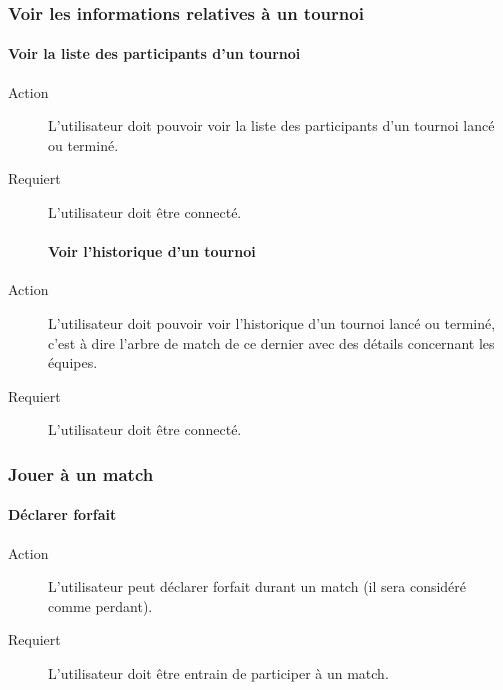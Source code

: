 \documentclass[a4paper]{article}
\begin{document}
\subsubsection{Voir les informations relatives à un tournoi}
\paragraph{Voir la liste des participants d'un tournoi}
\begin{description}
\item[Action] L'\gls{utilisateur} doit pouvoir voir la liste des participants d'un tournoi lancé ou terminé.
\item[Requiert] L'\gls{utilisateur} doit être connecté.
\paragraph{Voir l'historique d'un tournoi}
\item[Action] L'\gls{utilisateur} doit pouvoir voir l'historique d'un tournoi lancé ou terminé, c'est à dire l'arbre de match de ce dernier avec des détails concernant les équipes.
\item[Requiert] L'\gls{utilisateur} doit être connecté.
\end{description}

\subsubsection{Jouer à un match}
\paragraph{Déclarer forfait}
\begin{description}
\item[Action] L'\gls{utilisateur} peut déclarer forfait durant un match (il sera considéré comme perdant).
\item[Requiert] L'\gls{utilisateur} doit être entrain de participer à un match.
\end{description}
\end{document}
